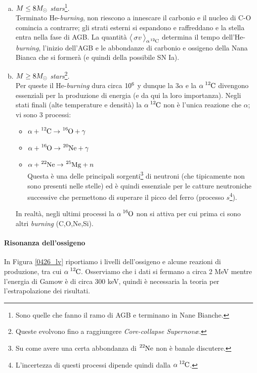 \begin{enumerate}[a)]
	\item $M\leq 8 M_{\odot}$ \textit{stars}\footnote{Sono quelle che fanno il ramo di AGB e terminano in Nane Bianche.}.\\ 
	Terminato He-\textit{burning}, non riescono a innescare il carbonio e il nucleo di C-O comincia a contrarre; gli strati esterni si espandono e raffreddano e la stella entra nella fase di AGB. La quantità $\mean{\sigma v}_{\alpha\ce{^{12}C}}$ determina il tempo dell'He-\textit{burning}, l'inizio dell'AGB e le abbondanze di carbonio e ossigeno della Nana Bianca che si formerà (e quindi della possibile SN Ia).  
	\item $M\geq 8M_{\odot}$ \textit{stars}\footnote{Queste evolvono fino a raggiungere \textit{Core-collapse Supernov\ae}.}.\\ 
	Per queste il He-\textit{burning} dura circa $10^{6}$ y dunque la $3\alpha$ e la $\alpha\,\ce{^{12}C}$ divengono essenziali per la produzione di energia (e da qui la loro importanza). Negli stati finali (alte temperature e densità) la $\alpha\,\ce{^{12}C}$ non è l'unica reazione che  $\alpha$; vi sono 3 processi:
	\begin{itemize}
		\item $\alpha + \ce{^{12}C} \to \ce{^{16}O} + \gamma$ 
		\item $\alpha + \ce{^{16}O} \to \ce{^{20}Ne} + \gamma $
		\item $\alpha + \ce{^{22}Ne} \to \ce{^{25}Mg} + n$\\ 
		Questa è una delle principali sorgenti\footnote{Su come avere una certa abbondanza di $\ce{^{22}Ne}$ non è banale discutere.} di neutroni (che tipicamente non sono presenti nelle stelle) ed è quindi essenziale per le catture neutroniche successive che permettono di superare il picco del ferro (processo $s$\footnote{L'incertezza di questi processi dipende quindi dalla $\alpha \, \ce{^{12}C}$.}).
	\end{itemize} 
	In realtà, negli ultimi processi la $\alpha \, \ce{^{16}O}$ non si attiva per cui prima ci sono altri \textit{burning} (C,O,Ne,Si).
\end{enumerate} 

\paragraph{Risonanza dell'ossigeno} 
In Figura \ref{0426_lv} riportiamo i livelli dell'ossigeno e alcune reazioni di produzione, tra cui $\alpha \, \ce{^{12}C}$. Osserviamo che i dati si fermano a circa 2 MeV mentre l'energia di Gamow è di circa 300 keV, quindi è necessaria la teoria per l'estrapolazione dei risultati.


